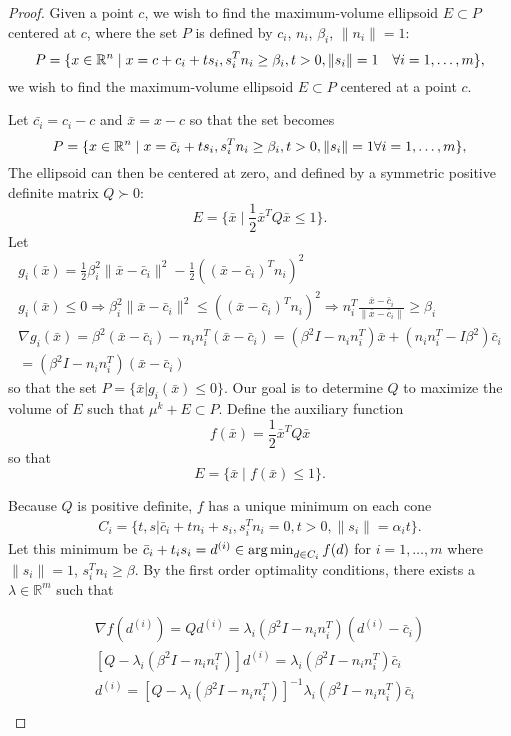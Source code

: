 \begin{proof}
Given a point $c$, we wish to find the maximum-volume ellipsoid  $E \subset P$ centered at $c$, where the set $P$ is defined by $c_i$, $n_i$, $\beta_i$, $\|n_i\| = 1$:
\[
P = \{ x \in {\mathbb R^{n}} \; | \;  x = c + c_i + ts_i, s_i^Tn_i \ge \beta_i, t>0, \|s_i\| = 1\quad \forall i = 1,\ldots,m\},
\]
we wish to find the maximum-volume ellipsoid $E \subset P$ centered at a point $c$.


Let $\bar{c_i} = c_i - c$ and $\bar x = x - c$ so that the set becomes
\[
P = \{ x \in {\mathbb R^{n}} \; | \;  x = \bar c_i + ts_i, s_i^Tn_i \ge \beta_i, t>0, \|s_i\| = 1 \forall i = 1,\ldots,m\},
\]
The ellipsoid can then be centered at zero, and defined by a symmetric positive definite matrix $Q \succ 0$:
\[
E = \{ \bar x \; | \; \frac 1 2 \bar x^T Q \bar x \le 1 \}.
\]
Let 
\begin{align*}
g_i(\bar x) = \frac 1 2 \beta_i^2\|\bar x - \bar c_i\|^2 - \frac 1 2 \left((\bar x - \bar c_i)^Tn_i\right)^2 \\
g_i(\bar x) \le 0 
\Longrightarrow \beta_i^2\|\bar x - \bar c_i\|^2 \le \left((\bar x - \bar c_i)^Tn_i\right)^2 \Longrightarrow n_i^T\frac{\bar x - \bar c_i}{\|\bar x - \bar c_i\|}\ge \beta_i \\
\nabla g_i(\bar x) = \beta^2(\bar x - \bar c_i) - n_in_i^T(\bar x - \bar c_i) = (\beta^2 I - n_i n_i^T) \bar x + (n_in_i^T - I\beta^2) \bar c_i \\
= \left(\beta^2I - n_in_i^T\right)(\bar x - \bar c_i)
\end{align*}
so that the set $P = \{\bar x | g_i(\bar x) \le 0\}$.
Our goal is to determine $Q$ to maximize the volume of $E$ such that $\mu^{k} + E \subset P$.
Define the auxiliary function 
\[
f(\bar x) = \frac 1 2 \bar x^T Q \bar x
\]
so that 
\[
E = \{ \bar x \; | \; f(\bar x) \le 1 \}.
\]

\color{red}
Because $Q$ is positive definite, $f$ has a unique minimum on each cone 
\begin{align*}
C_i = \{ t, s | \bar c_i + tn_i + s_i, s_i^Tn_i = 0, t>0, \|s_i\| = \alpha_i t \}.
\end{align*}
\color{black}
Let this minimum be $\bar c_i + t_i s_i = d^{(i)} \in \operatorname*{arg\,min}_{d \in C_i} f(d)$ for $i=1,\ldots,m$ where $\|s_i\| = 1$, $s_i^Tn_i \ge \beta$.
By the first order optimality conditions, there exists a $\lambda \in \mathbb R^m$ such that







\begin{align*}
\nabla f(d^{(i)}) = Q d^{(i)} = \lambda_i \left(\beta^2I - n_in_i^T\right)(d^{(i)} - \bar c_i) \\
\left[Q - \lambda_i (\beta^2 I - n_i n_i^T) \right]  d^{(i)} = \lambda_i \left(\beta^2I - n_in_i^T\right) \bar c_i \\
d^{(i)} = \left[Q - \lambda_i (\beta^2 I - n_i n_i^T) \right]^{-1}\lambda_i \left(\beta^2I - n_in_i^T\right) \bar c_i \\
\end{align*}



\end{proof}
